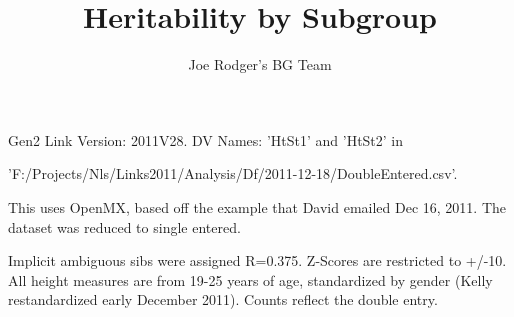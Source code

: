 \documentclass[a4paper]{article}
\title{Heritability by Subgroup}
\author{Joe Rodger's BG Team}
\begin{document}
\maketitle


Gen2 Link Version: 2011V28.  DV Names: 'HtSt1' and 'HtSt2' in

'F:/Projects/Nls/Links2011/Analysis/Df/2011-12-18/DoubleEntered.csv'.

This uses OpenMX, based off the example that David emailed Dec 16, 2011.  The dataset was reduced to single entered.

Implicit ambiguous sibs were assigned R=0.375. Z-Scores are restricted to  +/-10.  All height measures are from 19-25 years of age, standardized by gender (Kelly restandardized early December 2011).  Counts reflect the double entry.
\end{document}
